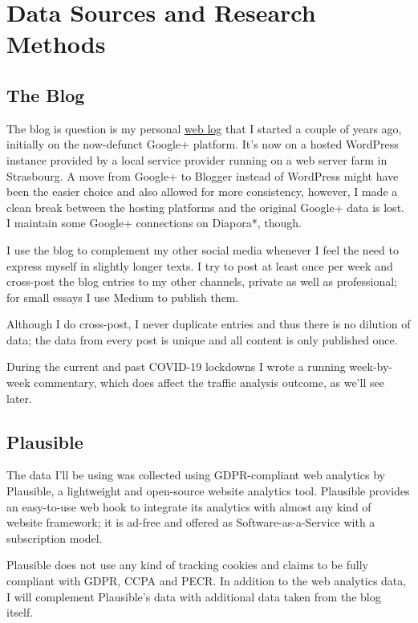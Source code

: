%
%

\pagebreak
\section{Data Sources and Research Methods}

\onehalfspacing

\subsection{The Blog}

The blog is question is my personal \href{https://chfrank.net/wordpress}{web log} that I started a couple of years ago, initially on the now-defunct Google+ platform. It's now on a hosted WordPress instance provided by a local service provider running on a web server farm in Strasbourg. A move from Google+ to Blogger instead of WordPress might have been the easier choice and also allowed for more consistency, however, I made a clean break between the hosting platforms and the original Google+ data is lost. I maintain some Google+ connections on Diapora*, though.

I use the blog to complement my other social media whenever I feel the need to express myself in slightly longer texts. I try to post at least once per week and cross-post the blog entries to my other channels, private as well as professional; for small essays I use Medium to publish them.

Although I do cross-post, I never duplicate entries and thus there is no dilution of data; the data from every post is unique and all content is only published once.

During the current and past COVID-19 lockdowns I wrote a running week-by-week commentary, which does affect the traffic analysis outcome, as we'll see later.

\subsection{Plausible}

The data I'll be using was collected using GDPR-compliant web analytics by Plausible, a lightweight and open-source website analytics tool. Plausible provides an easy-to-use web hook to integrate its analytics with almost any kind of website framework; it is ad-free and offered as Software-as-a-Service with a subscription model.

Plausible does not use any kind of tracking cookies and claims to be fully compliant with GDPR, CCPA and PECR. In addition to the web analytics data, I will complement Plausible's data with additional data taken from the blog itself.

